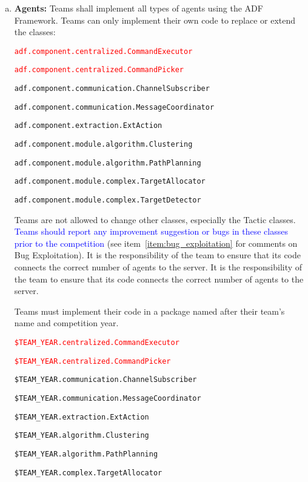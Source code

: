 \documentclass{article}
\begin{document}
\begin{enumerate}[(a)]
\item \textbf{Agents:} Teams shall implement all types of agents using the ADF Framework. Teams can only implement their own code to replace or extend the classes:

\small
\texttt{\textcolor{red}{adf.component.centralized.CommandExecutor}}

\texttt{\textcolor{red}{adf.component.centralized.CommandPicker}}

\texttt{adf.component.communication.ChannelSubscriber}

\texttt{adf.component.communication.MessageCoordinator}

\texttt{adf.component.extraction.ExtAction}

\texttt{adf.component.module.algorithm.Clustering}

\texttt{adf.component.module.algorithm.PathPlanning}

\texttt{adf.component.module.complex.TargetAllocator}

\texttt{adf.component.module.complex.TargetDetector}

\normalsize
Teams are not allowed to change other classes, especially the Tactic classes. \textcolor{blue}{Teams should report any improvement suggestion or bugs in these classes prior to the competition} (see item~\ref{item:bug_exploitation} for comments on Bug Exploitation). It is the responsibility of the team to ensure that its code connects the correct number of agents to the server. It is the responsibility of the team to ensure that its code connects the correct number of agents to the server.

Teams must implement their code in a package named after their team's name and competition year.

\small

\texttt{\textcolor{red}{\$TEAM\_YEAR.centralized.CommandExecutor}}

\texttt{\textcolor{red}{\$TEAM\_YEAR.centralized.CommandPicker}}

\texttt{\$TEAM\_YEAR.communication.ChannelSubscriber}

\texttt{\$TEAM\_YEAR.communication.MessageCoordinator}

\texttt{\$TEAM\_YEAR.extraction.ExtAction}

\texttt{\$TEAM\_YEAR.algorithm.Clustering}

\texttt{\$TEAM\_YEAR.algorithm.PathPlanning}

\texttt{\$TEAM\_YEAR.complex.TargetAllocator}


\end{enumerate}
\end{document}
